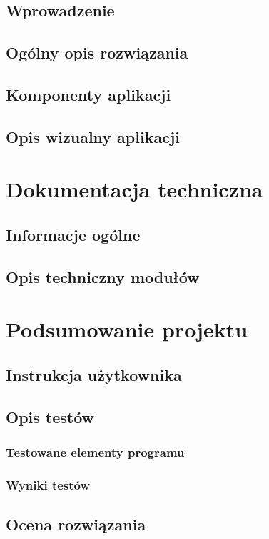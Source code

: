 \documentclass[12pt, oneside]{report}
\theoremstyle{definition}
\begin{document}
\section{Wprowadzenie}
\section{Ogólny opis rozwiązania}
\section{Komponenty aplikacji}
\section{Opis wizualny aplikacji}


\newpage
\chapter{Dokumentacja techniczna}
\section{Informacje ogólne} 
\section{Opis techniczny modułów}


\newpage
\chapter{Podsumowanie projektu}
\section{Instrukcja użytkownika}
\section{Opis testów}
\subsection{Testowane elementy programu}
\subsection{Wyniki testów}
\section{Ocena rozwiązania}
\end{document}
